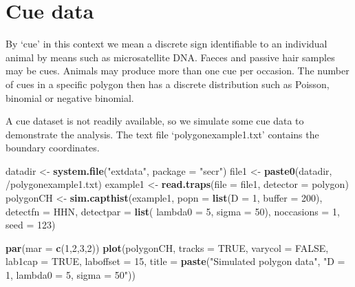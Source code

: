 \documentclass[
]{book}
\newenvironment{Shaded}{\begin{snugshade}}{\end{snugshade}}
\newcommand{\AttributeTok}[1]{\textcolor[rgb]{0.13,0.29,0.53}{#1}}
\newcommand{\ConstantTok}[1]{\textcolor[rgb]{0.56,0.35,0.01}{#1}}
\newcommand{\DecValTok}[1]{\textcolor[rgb]{0.00,0.00,0.81}{#1}}
\newcommand{\FunctionTok}[1]{\textcolor[rgb]{0.13,0.29,0.53}{\textbf{#1}}}
\newcommand{\NormalTok}[1]{#1}
\newcommand{\OtherTok}[1]{\textcolor[rgb]{0.56,0.35,0.01}{#1}}
\newcommand{\StringTok}[1]{\textcolor[rgb]{0.31,0.60,0.02}{#1}}
\begin{document}
\section{Cue data}\label{cue-data}

By `cue' in this context we mean a discrete sign identifiable to an individual animal by means such as microsatellite DNA. Faeces and passive hair samples may be cues. Animals may produce more than one cue per occasion. The number of cues in a specific polygon then has a discrete distribution such as Poisson, binomial or negative binomial.

A cue dataset is not readily available, so we simulate some cue data to demonstrate the analysis. The text file `polygonexample1.txt' contains the boundary coordinates.

\begin{Shaded}
\begin{Highlighting}[]
\NormalTok{datadir }\OtherTok{\textless{}{-}} \FunctionTok{system.file}\NormalTok{(}\StringTok{"extdata"}\NormalTok{, }\AttributeTok{package =} \StringTok{"secr"}\NormalTok{)}
\NormalTok{file1 }\OtherTok{\textless{}{-}} \FunctionTok{paste0}\NormalTok{(datadir, }\StringTok{\textquotesingle{}/polygonexample1.txt\textquotesingle{}}\NormalTok{)}
\NormalTok{example1 }\OtherTok{\textless{}{-}} \FunctionTok{read.traps}\NormalTok{(}\AttributeTok{file =}\NormalTok{ file1, }\AttributeTok{detector =} \StringTok{\textquotesingle{}polygon\textquotesingle{}}\NormalTok{)}
\NormalTok{polygonCH }\OtherTok{\textless{}{-}} \FunctionTok{sim.capthist}\NormalTok{(example1, }\AttributeTok{popn =} \FunctionTok{list}\NormalTok{(}\AttributeTok{D =} \DecValTok{1}\NormalTok{, }
    \AttributeTok{buffer =} \DecValTok{200}\NormalTok{), }\AttributeTok{detectfn =} \StringTok{\textquotesingle{}HHN\textquotesingle{}}\NormalTok{, }\AttributeTok{detectpar =} \FunctionTok{list}\NormalTok{(}
    \AttributeTok{lambda0 =} \DecValTok{5}\NormalTok{, }\AttributeTok{sigma =} \DecValTok{50}\NormalTok{), }\AttributeTok{noccasions =} \DecValTok{1}\NormalTok{, }\AttributeTok{seed =} \DecValTok{123}\NormalTok{)}
\end{Highlighting}
\end{Shaded}



\begin{Shaded}
\begin{Highlighting}[]
\FunctionTok{par}\NormalTok{(}\AttributeTok{mar =} \FunctionTok{c}\NormalTok{(}\DecValTok{1}\NormalTok{,}\DecValTok{2}\NormalTok{,}\DecValTok{3}\NormalTok{,}\DecValTok{2}\NormalTok{))}
\FunctionTok{plot}\NormalTok{(polygonCH, }\AttributeTok{tracks =} \ConstantTok{TRUE}\NormalTok{, }\AttributeTok{varycol =} \ConstantTok{FALSE}\NormalTok{, }\AttributeTok{lab1cap =} \ConstantTok{TRUE}\NormalTok{,}
    \AttributeTok{laboffset =} \DecValTok{15}\NormalTok{, }\AttributeTok{title =} \FunctionTok{paste}\NormalTok{(}\StringTok{"Simulated \textquotesingle{}polygon\textquotesingle{} data"}\NormalTok{, }
    \StringTok{"D = 1, lambda0 = 5, sigma = 50"}\NormalTok{))}
\end{Highlighting}
\end{Shaded}
\end{document}
